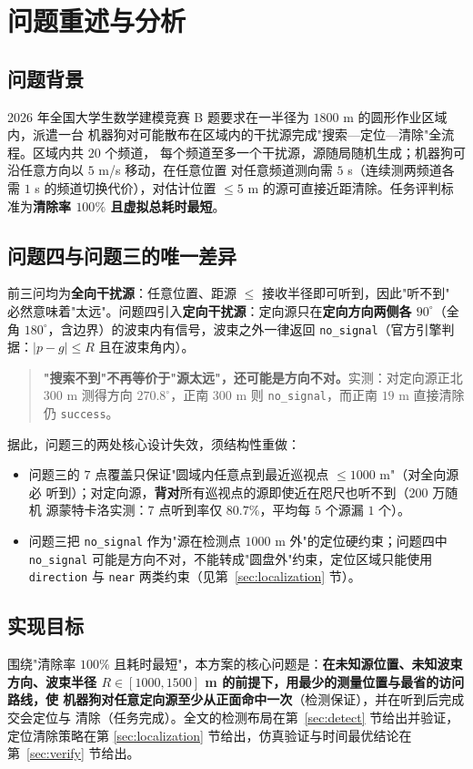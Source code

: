 \section{问题重述与分析}

\subsection{问题背景}

2026 年全国大学生数学建模竞赛 B 题要求在一半径为 $1800$ m 的圆形作业区域内，派遣一台
机器狗对可能散布在区域内的干扰源完成"搜索—定位—清除"全流程。区域内共 $20$ 个频道，
每个频道至多一个干扰源，源随局随机生成；机器狗可沿任意方向以 $5$ m/s 移动，在任意位置
对任意频道测向需 $5$ s（连续测两频道各需 $1$ s 的频道切换代价），对估计位置 $\le 5$ m
的源可直接近距清除。任务评判标准为\textbf{清除率 $100\%$ 且虚拟总耗时最短}。

\subsection{问题四与问题三的唯一差异}

前三问均为\textbf{全向干扰源}：任意位置、距源 $\le$ 接收半径即可听到，因此"听不到"
必然意味着"太远"。问题四引入\textbf{定向干扰源}：定向源只在\textbf{定向方向两侧各
$90^\circ$}（全角 $180^\circ$，含边界）的波束内有信号，波束之外一律返回
\texttt{no\_signal}（官方引擎判据：$|p-g|\le R$ 且在波束角内）。

\begin{quote}
\textbf{"搜索不到"不再等价于"源太远"，还可能是方向不对。}实测：对定向源正北 $300$ m
测得方向 $270.8^\circ$，正南 $300$ m 则 \texttt{no\_signal}，而正南 $19$ m 直接清除仍
\texttt{success}。
\end{quote}

据此，问题三的两处核心设计失效，须结构性重做：
\begin{itemize}
  \item 问题三的 $7$ 点覆盖只保证"圆域内任意点到最近巡视点 $\le 1000$ m"（对全向源必
        听到）；对定向源，\textbf{背对}所有巡视点的源即使近在咫尺也听不到（$200$ 万随机
        源蒙特卡洛实测：$7$ 点听到率仅 $80.7\%$，平均每 $5$ 个源漏 $1$ 个）。
  \item 问题三把 \texttt{no\_signal} 作为"源在检测点 $1000$ m 外"的定位硬约束；问题四中
        \texttt{no\_signal} 可能是方向不对，不能转成"圆盘外"约束，定位区域只能使用
        \texttt{direction} 与 \texttt{near} 两类约束（见第~\ref{sec:localization} 节）。
\end{itemize}

\subsection{实现目标}

围绕"清除率 $100\%$ 且耗时最短"，本方案的核心问题是：\textbf{在未知源位置、未知波束
方向、波束半径 $R\in[1000,1500]$ m 的前提下，用最少的测量位置与最省的访问路线，使
机器狗对\textbf{任意}定向源至少从正面命中一次}（检测保证），并在听到后完成交会定位与
清除（任务完成）。全文的检测布局在第~\ref{sec:detect} 节给出并验证，定位清除策略在第
\ref{sec:localization} 节给出，仿真验证与时间最优结论在第~\ref{sec:verify} 节给出。